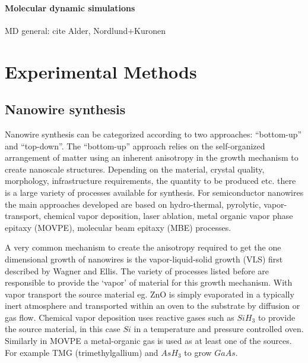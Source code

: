 \subsubsection{Molecular dynamic simulations}

MD general: cite Alder, Nordlund+Kuronen


\chapter{Experimental Methods}



\section{Nanowire synthesis}

Nanowire synthesis can be categorized according to two approaches: ``bottom-up'' and ``top-down''. The ``bottom-up'' approach relies on the self-organized arrangement of matter using an inherent anisotropy in the growth mechanism to create nanoscale structures. Depending on the material, crystal quality, morphology, infrastructure requirements, the quantity to be produced etc. there is a large variety of processes available for synthesis. For semiconductor nanowires the main approaches developed are based on hydro-thermal, pyrolytic, vapor-transport, chemical vapor deposition, laser ablation, metal organic vapor phase epitaxy (MOVPE), molecular beam epitaxy (MBE) processes. 

A very common mechanism to create the anisotropy required to get the one dimensional growth of nanowires is the vapor-liquid-solid growth (VLS) first described by Wagner and Ellis. The variety of processes listed before are responsible to provide the `vapor' of material for this growth mechanism. With vapor transport the source material eg. ZnO is simply evaporated in a typically inert atmosphere and transported within an oven to the substrate by diffusion or gas flow. Chemical vapor deposition uses reactive gases such as $SiH_3$ to provide the source material, in this case $Si$ in a temperature and pressure controlled oven. Similarly in MOVPE a metal-organic gas is used as at least one of the sources. For example TMG (trimethylgallium) and $AsH_3$ to grow $GaAs$.


